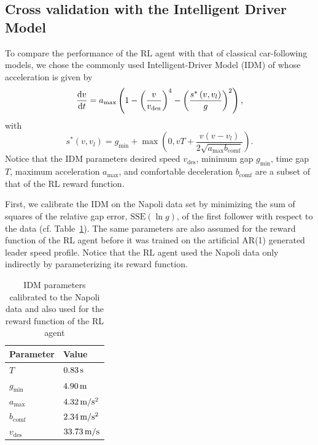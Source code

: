 \documentclass[review]{elsarticle}
\providecommand{\martin}[1]{#1}                  %
\providecommand{\sub}[1]{_{\mathrm{#1}}}  %
\providecommand{\3}{{\ss}}
\begin{document}
\subsection{Cross validation with the Intelligent Driver Model}
\label{sec:crossValIDM}
To compare the performance of the RL agent with that of
classical car-following models, we chose the commonly used
Intelligent-Driver Model (IDM) of \cite{Opus} whose acceleration is given
by 
\begin{equation}
\label{eq:IDM}
\martin{\dv{v}{t}}=a\sub{max}\left(1-\left(\frac{v}{v\sub{des}}\right)^{4}-\left(\frac{s^{*}\left(v, \martin{v_l}\right)}{g}\right)^{2}\right),
\end{equation}
with
\begin{equation}
\label{eq:IDMsstar}
s^{*}\left(v, v_l\right)=g\sub{min}+\max \left(0,vT+\frac{v(v-v_l)}{2 \sqrt{a\sub{max} b\sub{comf}}}\right).
\end{equation}
Notice that the IDM parameters desired
speed $v\sub{des}$, minimum gap $g\sub{min}$, time gap $T$, maximum
acceleration $a\sub{max}$, and
comfortable deceleration $b\sub{comf}$ are a subset of that of the RL reward
function. 

First, we calibrate the IDM on the Napoli data set by
minimizing the sum of squares of the relative gap error,
$\mathrm{SSE}(\ln g)$, of the first follower with respect to the
data (cf. Table~\ref{tab:IDMparameters}). The same parameters are also
assumed for the reward function of the RL agent before it was trained
on the artificial AR(1) generated leader speed profile. Notice that the RL agent used the Napoli data only
indirectly by parameterizing its reward function.

\begin{table}
	\caption{IDM parameters calibrated to the Napoli
            data and also used for the reward function of the RL agent}
	\label{tab:IDMparameters} 
	\begin{center}
		\begin{tabular}{ p{} |p{}  } 
		Parameter & Value   \\ \hline
			$T$ & $\unit[0.83]{s}$\\
			$g\sub{min}$ & $\unit[4.90]{m}$\\
			$a\sub{max}$ & $\unit[4.32]{m/s^2}$\\
			$b\sub{comf}$ & $\unit[2.34]{ m/s^2}$\\
			$v\sub{des}$ & $\unit[33.73]{m/s}$
			
		\end{tabular}
	\end{center}
\end{table}
\end{document}
